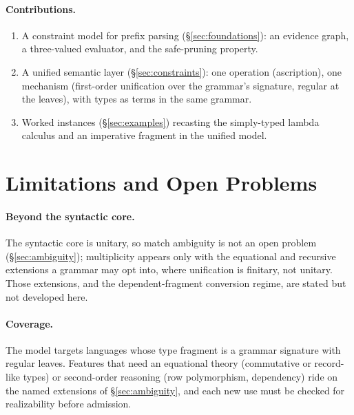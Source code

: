 \documentclass[11pt]{article}
\begin{document}
\paragraph{Contributions.}
\begin{enumerate}[nosep]
  \item A constraint model for prefix parsing (\S\ref{sec:foundations}): an
        evidence graph, a three-valued evaluator, and the safe-pruning property.
  \item A unified semantic layer (\S\ref{sec:constraints}): one operation
        (ascription), one mechanism (first-order unification over the grammar's
        signature, regular at the leaves), with types as terms in the same grammar.
  \item Worked instances (\S\ref{sec:examples}) recasting the simply-typed
        lambda calculus and an imperative fragment in the unified model.
\end{enumerate}






\section{Limitations and Open Problems}
\label{sec:limitations}

\paragraph{Beyond the syntactic core.}
The syntactic core is unitary, so match ambiguity is not an open problem
(\S\ref{sec:ambiguity}); multiplicity appears only with the equational and
recursive extensions a grammar may opt into, where unification is finitary, not
unitary. Those extensions, and the dependent-fragment conversion regime, are
stated but not developed here.

\paragraph{Coverage.}
The model targets languages whose type fragment is a grammar signature with
regular leaves. Features that need an equational theory (commutative or
record-like types) or second-order reasoning (row polymorphism, dependency) ride
on the named extensions of \S\ref{sec:ambiguity}, and each new use must be
checked for realizability before admission.
\end{document}
